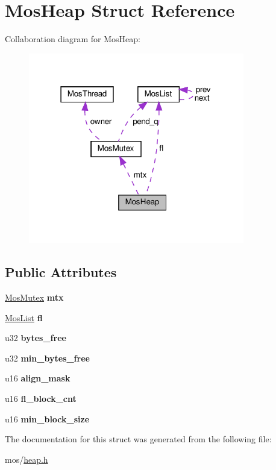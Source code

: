 \hypertarget{structMosHeap}{}\section{Mos\+Heap Struct Reference}
\label{structMosHeap}


Collaboration diagram for Mos\+Heap\+:\nopagebreak
\begin{figure}[H]
\begin{center}
\leavevmode
\includegraphics[width=267pt]{structMosHeap__coll__graph}
\end{center}
\end{figure}
\subsection*{Public Attributes}
\begin{DoxyCompactItemize}
\item 
\mbox{\label{structMosHeap_ac1f21f9b3444ba6e39a35941fef2b8d8}} 
\hyperlink{structMosMutex}{Mos\+Mutex} {\bfseries mtx}
\item 
\mbox{\label{structMosHeap_a330bbbbbb97880f9108fe2655c035802}} 
\hyperlink{structMosList}{Mos\+List} {\bfseries fl}
\item 
\mbox{\label{structMosHeap_a9cb5599f50592171ab7a5f3d2fed25a9}} 
u32 {\bfseries bytes\+\_\+free}
\item 
\mbox{\label{structMosHeap_a5455d71a4efaf4ac5db03c861077b911}} 
u32 {\bfseries min\+\_\+bytes\+\_\+free}
\item 
\mbox{\label{structMosHeap_a1fcf6dc27b69893dfb6fb6a50afbea23}} 
u16 {\bfseries align\+\_\+mask}
\item 
\mbox{\label{structMosHeap_a61e4c7b2ef32a8e1b53668228e67e7a1}} 
u16 {\bfseries fl\+\_\+block\+\_\+cnt}
\item 
\mbox{\label{structMosHeap_a6752200325f092909228c3e0f001f64d}} 
u16 {\bfseries min\+\_\+block\+\_\+size}
\end{DoxyCompactItemize}


The documentation for this struct was generated from the following file\+:\begin{DoxyCompactItemize}
\item 
mos/\hyperlink{heap_8h}{heap.\+h}\end{DoxyCompactItemize}
